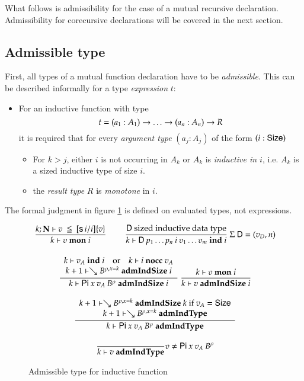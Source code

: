\newcommand{\mon}[3]{#1\vdash#2\mbox{ \textbf{mon} }#3}
\newcommand{\indu}[3]{#1\vdash#2\mbox{ \textbf{ind} }#3}
\newcommand{\coind}[3]{#1\vdash#2\mbox{ \textbf{coind} }#3}
\newcommand{\admIndSize}[3]{#1\vdash#2\mbox{ \textbf{admIndSize} }#3}
\newcommand{\admCoSize}[3]{#1\vdash#2\mbox{ \textbf{admCoSize} }#3}
\newcommand{\admIndType}[2]{#1\vdash#2\mbox{ \textbf{admIndType}}}
\newcommand{\admCoType}[2]{#1\vdash#2\mbox{ \textbf{admCoType}}}

\newcommand{\sizePat}[1]{\vdash#1\mbox{ \textbf{sizePat}}}
\newcommand{\sizePats}[1]{\vdash#1\mbox{ \textbf{sizePats}}}

What follows is admissibility for the case of a mutual recursive declaration.
Admissibility for corecursive declarations will be covered in the next section.
\subsection{Admissible type}

First, all types of a mutual function declaration have to be \emph{admissible}.
This can be described informally for a type \emph{expression} $t$:
\begin{itemize}
\item
For an inductive function with type \[t = (a_1 : A_1) \rightarrow \ldots \rightarrow (a_n : A_n) \rightarrow R\]
it is required that for every \emph{argument type} $(a_j : A_j)$ of the form $(i : \mathsf{Size})$  
\begin{itemize}
\item
For $k>j$, either $i$ is not occurring in $A_k$ or $A_k$ is \emph{inductive in $i$}, i.e. $A_k$ is a sized inductive type of size $i$.
\item
the \emph{result type} $R$ is \emph{monotone} in $i$. 
\end{itemize}
\end{itemize}
The formal judgment in figure \ref{admi} is defined on evaluated types, not expressions.

\begin{figure}[htp]
\begin{gather*}
\nru{}
{\LeqVal{k}{\nF}{v}{\subst{[\s i/i]}{v}}}
{\mon{k}{v}{i}}
\qquad
\nru{}
{\DD \mbox{ sized inductive data type}}
{\indu{k}{\DD \: p_1 \ldots p_n \: i \: v_1 \ldots v_m}{i}}
{\: \Sig \: \DD = (v_D,n)}
\\[2ex]
\ndru{}
{\indu{k}{v_A}{i} \quad \mbox{or} \quad \nocc{k}{i}{v_A}}
{\admIndSize{k+1}{\wh \cl{B}{\ins{\rho}{x}{k}}}{i}}
{\admIndSize{k}{\vpi \: x \: v_A \: \cl{B}{\rho}}{i}}
\nru{}
{\mon{k}{v}{i}}
{\admIndSize{k}{v}{i}}
\\[2ex]
\ndru{}
{\admIndSize{k+1}{\wh \cl{B}{\ins{\rho}{x}{k}}}{k} \mbox{ if } v_A = \Size}
{\admIndType{k+1}{\wh \cl{B}{\ins{\rho}{x}{k}}}}
{\admIndType{k}{\vpi \: x \: v_A \: \cl{B}{\rho}}}
\\[2ex]
\nru{}
{}
{\admIndType{k}{v}}
v \neq \vpi \: x \: v_A \: \cl{B}{\rho}
\end{gather*}
\caption{Admissible type for inductive function}
\label{admi}
\end{figure}

